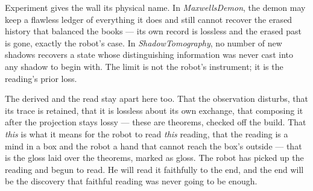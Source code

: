 Experiment gives the wall its physical name.
In \emph{MaxwellsDemon}, the demon may keep a flawless ledger of everything it does and still cannot recover the erased
history that balanced the books --- its own record is lossless and the erased past is gone, exactly the robot's case.
In \emph{ShadowTomography}, no number of new shadows recovers a state whose distinguishing information was never cast into
any shadow to begin with.
The limit is not the robot's instrument; it is the reading's prior loss.

The derived and the read stay apart here too.
That the observation disturbs, that its trace is retained, that it is lossless about its own exchange, that composing it
after the projection stays lossy --- these are theorems, checked off the build.
That \emph{this} is what it means for the robot to read \emph{this} reading, that the reading is a mind in a box and the
robot a hand that cannot reach the box's outside --- that is the gloss laid over the theorems, marked as gloss.
The robot has picked up the reading and begun to read.
He will read it faithfully to the end, and the end will be the discovery that faithful reading was never going to be
enough.
